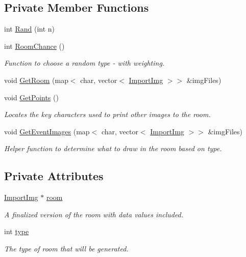 \subsection*{Private Member Functions}
\begin{DoxyCompactItemize}
\item 
int \hyperlink{classRoom_aebcb2b6bf73c7a2592a1e5c5d02b40ce}{Rand} (int n)
\item 
int \hyperlink{classRoom_aa44d19f37e62cbf130727c7aa3be0757}{Room\-Chance} ()
\begin{DoxyCompactList}\small\item\em Function to choose a random type -\/ with weighting. \end{DoxyCompactList}\item 
void \hyperlink{classRoom_ad791cbeff004df5ae7c8655f85e540ae}{Get\-Room} (map$<$ char, vector$<$ \hyperlink{classImportImg}{Import\-Img} $>$$>$ \&img\-Files)
\item 
void \hyperlink{classRoom_a15f3f815f6d41e61e7e12465994fa185}{Get\-Points} ()
\begin{DoxyCompactList}\small\item\em Locates the key characters used to print other images to the room. \end{DoxyCompactList}\item 
void \hyperlink{classRoom_a3e33111e62068e4ae0fef5b17a1f1841}{Get\-Event\-Images} (map$<$ char, vector$<$ \hyperlink{classImportImg}{Import\-Img} $>$$>$ \&img\-Files)
\begin{DoxyCompactList}\small\item\em Helper function to determine what to draw in the room based on type. \end{DoxyCompactList}\end{DoxyCompactItemize}
\subsection*{Private Attributes}
\begin{DoxyCompactItemize}
\item 
\hyperlink{classImportImg}{Import\-Img} $\ast$ \hyperlink{classRoom_a4d493bf25d07a6880b399adedd3a10e6}{room}
\begin{DoxyCompactList}\small\item\em A finalized version of the room with data values included. \end{DoxyCompactList}\item 
int \hyperlink{classRoom_a209eba22dbc85cb190906de3f0363e59}{type}
\begin{DoxyCompactList}\small\item\em The type of room that will be generated. \end{DoxyCompactList}\end{DoxyCompactItemize}


